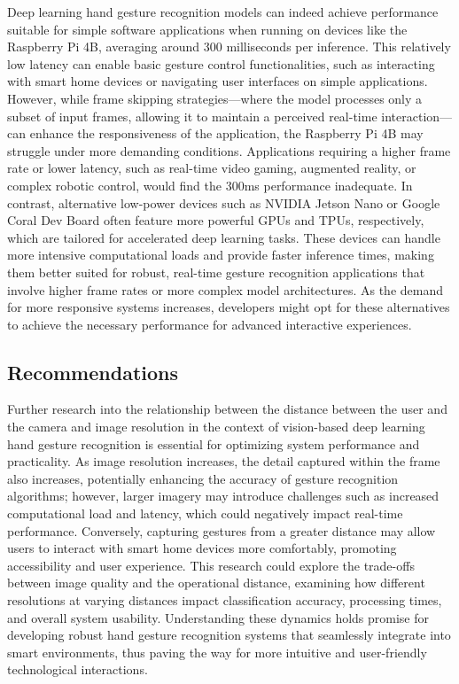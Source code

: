 \documentclass[12pt]{article}
\begin{document}
Deep learning hand gesture recognition models can indeed achieve performance suitable for simple software applications when running on devices like the Raspberry Pi 4B, averaging around 300 milliseconds per inference. This relatively low latency can enable basic gesture control functionalities, such as interacting with smart home devices or navigating user interfaces on simple applications. However, while frame skipping strategies—where the model processes only a subset of input frames, allowing it to maintain a perceived real-time interaction—can enhance the responsiveness of the application, the Raspberry Pi 4B may struggle under more demanding conditions. Applications requiring a higher frame rate or lower latency, such as real-time video gaming, augmented reality, or complex robotic control, would find the 300ms performance inadequate. In contrast, alternative low-power devices such as NVIDIA Jetson Nano or Google Coral Dev Board often feature more powerful GPUs and TPUs, respectively, which are tailored for accelerated deep learning tasks. These devices can handle more intensive computational loads and provide faster inference times, making them better suited for robust, real-time gesture recognition applications that involve higher frame rates or more complex model architectures. As the demand for more responsive systems increases, developers might opt for these alternatives to achieve the necessary performance for advanced interactive experiences.

\subsection{Recommendations}

Further research into the relationship between the distance between the user and the camera and image resolution in the context of vision-based deep learning hand gesture recognition is essential for optimizing system performance and practicality. As image resolution increases, the detail captured within the frame also increases, potentially enhancing the accuracy of gesture recognition algorithms; however, larger imagery may introduce challenges such as increased computational load and latency, which could negatively impact real-time performance. Conversely, capturing gestures from a greater distance may allow users to interact with smart home devices more comfortably, promoting accessibility and user experience. This research could explore the trade-offs between image quality and the operational distance, examining how different resolutions at varying distances impact classification accuracy, processing times, and overall system usability. Understanding these dynamics holds promise for developing robust hand gesture recognition systems that seamlessly integrate into smart environments, thus paving the way for more intuitive and user-friendly technological interactions.
\end{document}
